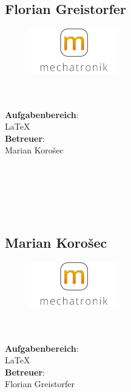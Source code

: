 \subsection*{Florian Greistorfer}
\begin{figure}
\begin{center}
  \includegraphics[width=0.35\textwidth]{fig/logoMecha}
\end{center}
\end{figure}
\mbox{}\\
\mbox{}\\
\textbf{Aufgabenbereich}:\\
\LaTeX{}\\
\textbf{Betreuer}:\\
Marian Korošec
\mbox{}\\
\mbox{}\\
\mbox{}\\
\mbox{}\\
\mbox{}\\
\mbox{}\\

\subsection*{Marian Korošec}
\begin{figure}
\begin{center}
  \includegraphics[width=0.35\textwidth]{fig/logoMecha}
\end{center}
\end{figure}
\mbox{}\\
\mbox{}\\
\textbf{Aufgabenbereich}:\\
\LaTeX{}\\
\textbf{Betreuer}:\\
Florian Greistorfer
\mbox{}\\
\mbox{}\\
\mbox{}\\
\mbox{}\\
\mbox{}\\
\newpage

